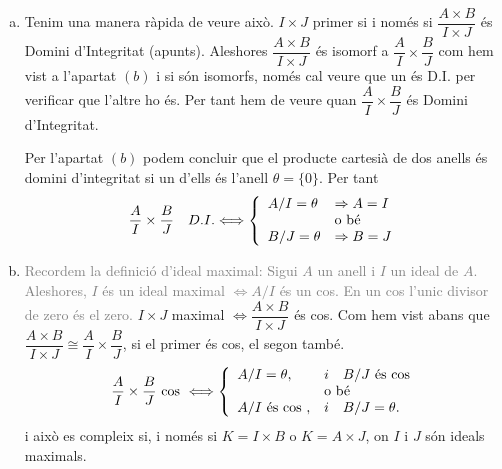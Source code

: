 \documentclass[../main.tex]{subfiles}
\begin{document}
\begin{enumerate}[(a)]
    \item Tenim una manera ràpida de veure això. $I\times J$ primer si i només si $\dfrac{A\times B}{I\times J}$ és Domini d'Integritat (apunts). Aleshores $\dfrac{A\times B}{I\times J}$ és isomorf a $\dfrac{A}{I}\times \dfrac{B}{J}$ com hem vist a l'apartat $(b)$ i si són isomorfs, només cal veure que un és D.I. per verificar que l'altre ho és. Per tant hem de veure quan $\dfrac{A}{I}\times \dfrac{B}{J}$ és Domini d'Integritat. 
    
    Per l'apartat $(b)$ podem concluir que el producte cartesià de dos anells és domini d'integritat si un d'ells és l'anell $\theta  = \{0\}$. Per tant
    \begin{equation}
        \notag
        \dfrac{A}{I}\times\dfrac{B}{J}\quad D.I. \Longleftrightarrow \left\{
        \begin{array}{ll}
             A/I = \theta & \Rightarrow A=I \\
                    & \text{o bé} \\
            B/J = \theta & \Rightarrow B=J
        \end{array}
        \right.
    \end{equation}
    
    \item \textcolor{gray}{Recordem la definició d'ideal maximal: Sigui $A$ un anell i $I$ un ideal de $A$. Aleshores, $I$ és un ideal maximal $\Longleftrightarrow A/I$ és un cos. En un cos l'unic divisor de zero és el zero. } $I\times J$ maximal $\Longleftrightarrow \dfrac{A\times B}{I\times J}$ és cos. Com hem vist abans que $\dfrac{A\times B}{I\times J} \cong \dfrac{A}{I}\times \dfrac{B}{J}$, si el primer és cos, el segon també. 
    \begin{equation}
        \notag
        \dfrac{A}{I}\times \dfrac{B}{J} \text{ cos } \Longleftrightarrow\left\{
        \begin{array}{ll}
             A/I = \theta, & i \quad B/J \text{ és cos} \\
                        &\text{o bé} \\
             A/I \text{ és cos }, & i \quad B/J=\theta.
        \end{array}
        \right.
    \end{equation}
    i això es compleix si, i només si $K=I\times B$ o $K=A\times J$, on $I$ i $J$ són ideals maximals.
\end{enumerate}
\end{document}
